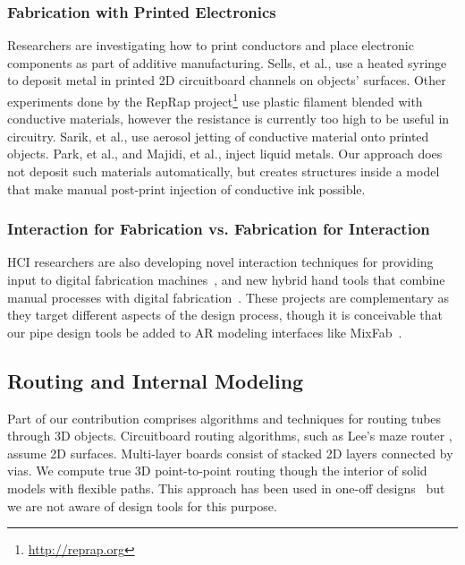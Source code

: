 \subsubsection{Fabrication with Printed Electronics}
Researchers are investigating how to print conductors and place electronic components as part of additive manufacturing.  Sells, et al., \cite{Sells-reprap} use a heated syringe to deposit metal in printed 2D circuitboard channels on objects' surfaces.  Other experiments done by the RepRap project\footnote{\url{http://reprap.org}} use plastic filament blended with conductive materials, however the resistance is currently too high to be useful in circuitry.  Sarik, et al., \cite{Sarik-tracebrush} use aerosol jetting of conductive material onto printed objects.  Park, et al., \cite{Park-microchannels} and Majidi, et al., \cite{Majidi-curvature} inject liquid metals.   Our approach does not deposit such materials automatically, but creates structures inside a model that make manual post-print injection of conductive ink possible.

\subsubsection{Interaction for Fabrication vs. Fabrication for Interaction}
HCI researchers are also developing novel interaction techniques for providing input to digital fabrication machines~\cite{Mueller-constructable,mixfab,Willis-interactive}, and new hybrid hand tools that combine manual processes with digital fabrication~\cite{rivers2012position,zoran2013freed}. These projects are complementary as they target different aspects of the design process, though it is conceivable that our pipe design tools be added to AR modeling interfaces like MixFab~\cite{mixfab}.

\subsection{Routing and Internal Modeling}
Part of our contribution comprises algorithms and techniques for routing tubes through 3D objects.
Circuitboard routing algorithms, such as Lee's maze router \cite{Lee-maze}, assume 2D surfaces. Multi-layer boards consist of stacked 2D layers connected by vias. We compute true 3D point-to-point routing though the interior of solid models with flexible paths. This approach has been used in one-off designs~\cite{Navarrette-gps} but we are not aware of design tools for this purpose.

